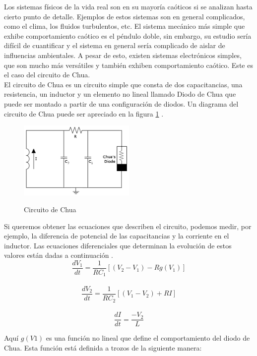 \documentclass[%
 reprint,
%
 amsmath,amssymb,
 aps,
]{revtex4-1}
\begin{document}
Los sistemas físicos de la vida real son en su mayoría caóticos si se analizan hasta cierto punto de detalle. Ejemplos de estos sistemas son en general complicados, como el clima, los fluidos turbulentos, etc. El sistema mecánico más simple que exhibe comportamiento caótico es el péndulo doble, sin embargo, su estudio sería difícil de cuantificar y el sistema en general sería complicado de aislar de influencias ambientales. A pesar de esto, existen sistemas electrónicos simples, que son mucho más versátiles y también exhiben comportamiento caótico. Este es el caso del circuito de Chua.\\

El circuito de Chua es un circuito simple que consta de dos capacitancias, una resistencia, un inductor y un elemento no lineal llamado Diodo de Chua que puede ser montado a partir de una configuración de diodos. Un diagrama del circuito de Chua puede ser apreciado en la figura \ref{fig:Chua} \cite{Website}.


\begin{figure}[h!]
\caption{Circuito de Chua}
\centering
\includegraphics[width=0.50\textwidth]{chua}
\label{fig:Chua}
\end{figure}

Si queremos obtener las ecuaciones que describen el circuito, podemos medir, por ejemplo, la diferencia de potencial de las capacitancias y la corriente en el inductor. Las ecuaciones diferenciales que determinan la evolución de estos valores están dadas a continuación \cite{Website}.\\


$$
\frac{dV_1}{dt} = \frac{1}{RC_1}[(V_2-V_1) - Rg(V_1)] $$\\$$
\frac{dV_2}{dt} = \frac{1}{RC_2}[(V_1-V_2) + RI	   ]  $$	\\$$
\frac{dI}{dt} =    \frac{-V_2}{L}			$$	

Aquí $g(V1)$ es una función no lineal que define el comportamiento del diodo de Chua. Esta función está definida a trozos de la siguiente manera:\\
\end{document}
